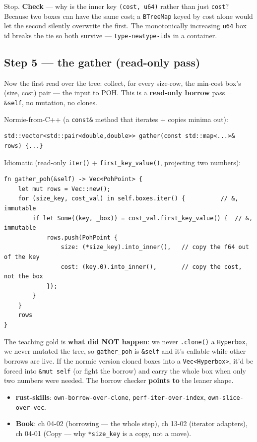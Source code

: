 \documentclass[11pt]{article}
\begin{document}
Stop. \textbf{\textbf{Check}} — why is the inner key \texttt{(cost, u64)} rather than just \texttt{cost}?
Because two boxes can have the same cost; a \texttt{BTreeMap} keyed by cost alone
would let the second silently overwrite the first. The monotonically increasing
\texttt{u64} box id breaks the tie so both survive — \texttt{type-newtype-ids} in a container.
\subsection{Step 5 — the gather (read-only pass)}
\label{sec:orga685729}

Now the first read over the tree: collect, for every size-row, the min-cost
box's (size, cost) pair — the input to POH. This is a \textbf{\textbf{read-only borrow}} pass
= \texttt{\&self}, no mutation, no clones.

Normie-from-C++ (a \texttt{const\&} method that iterates + copies minima out):
\begin{verbatim}
std::vector<std::pair<double,double>> gather(const std::map<...>& rows) {...}
\end{verbatim}

Idiomatic (read-only \texttt{iter()} + \texttt{first\_key\_value()}, projecting two numbers):
\begin{verbatim}
fn gather_poh(&self) -> Vec<PohPoint> {
    let mut rows = Vec::new();
    for (size_key, cost_val) in self.boxes.iter() {          // &, immutable
        if let Some((key, _box)) = cost_val.first_key_value() {  // &, immutable
            rows.push(PohPoint {
                size: (*size_key).into_inner(),   // copy the f64 out of the key
                cost: (key.0).into_inner(),       // copy the cost, not the box
            });
        }
    }
    rows
}
\end{verbatim}

The teaching gold is \textbf{what did NOT happen}: we never \texttt{.clone()} a \texttt{Hyperbox},
we never mutated the tree, so \texttt{gather\_poh} is \texttt{\&self} and it's callable while
other borrows are live. If the normie version cloned boxes into a
\texttt{Vec<Hyperbox>}, it'd be forced into \texttt{\&mut self} (or fight the borrow) and carry
the whole box when only two numbers were needed. The borrow checker \textbf{points to}
the leaner shape.

\begin{itemize}
\item \textbf{\textbf{rust-skills}}: \texttt{own-borrow-over-clone}, \texttt{perf-iter-over-index},
\texttt{own-slice-over-vec}.
\item \textbf{\textbf{Book}}: ch 04-02 (borrowing — the whole step), ch 13-02 (iterator
adapters), ch 04-01 (Copy — why \texttt{*size\_key} is a copy, not a move).
\end{itemize}
\end{document}
